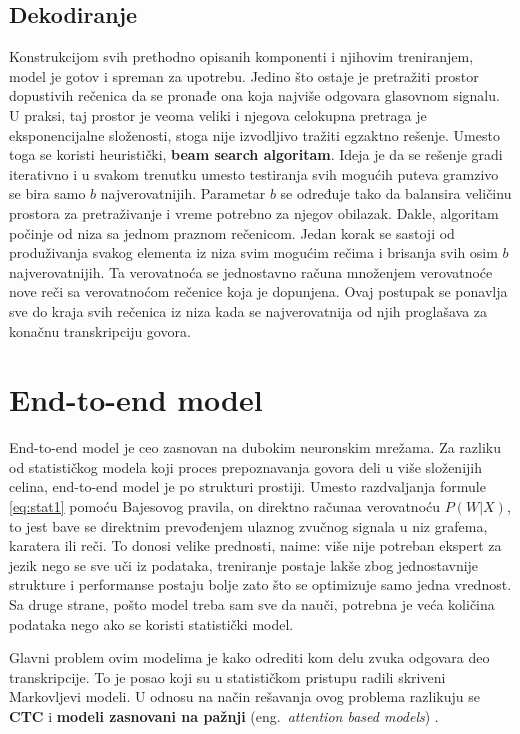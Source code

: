 \documentclass[a4paper]{article}
\begin{document}
\subsection{Dekodiranje}
\label{sec:dekodiranje}

Konstrukcijom svih prethodno opisanih komponenti i njihovim treniranjem, model je gotov i spreman za upotrebu.
Jedino što ostaje je pretražiti prostor dopustivih rečenica da se pronađe ona koja najviše odgovara glasovnom signalu.
U praksi, taj prostor je veoma veliki i njegova celokupna pretraga je eksponencijalne složenosti, stoga nije izvodljivo tražiti egzaktno rešenje.
Umesto toga se koristi heuristički, \textbf{beam search algoritam}.
Ideja je da se rešenje gradi iterativno i u svakom trenutku umesto testiranja svih mogućih puteva gramzivo se bira samo $b$ najverovatnijih.
Parametar $b$ se određuje tako da balansira veličinu prostora za pretraživanje i vreme potrebno za njegov obilazak.
Dakle, algoritam počinje od niza sa jednom praznom rečenicom.
Jedan korak se sastoji od produživanja svakog elementa iz niza svim mogućim rečima i brisanja svih osim $b$ najverovatnijih.
Ta verovatnoća se jednostavno računa množenjem verovatnoće nove reči sa verovatnoćom rečenice koja je dopunjena.
Ovaj postupak se ponavlja sve do kraja svih rečenica iz niza kada se najverovatnija od njih proglašava za konačnu transkripciju govora.

\section{End-to-end model}
\label{sec:e2e}

End-to-end model je ceo zasnovan na dubokim neuronskim mrežama.
Za razliku od statističkog modela koji proces prepoznavanja govora deli u više složenijih celina, end-to-end model je po strukturi prostiji.
Umesto razdvaljanja formule \ref{eq:stat1} pomoću Bajesovog pravila, on direktno računaa verovatnoću $P(W|X)$, to jest
bave se direktnim prevođenjem ulaznog zvučnog signala u niz grafema, karatera ili reči.
To donosi velike prednosti, naime: više nije potreban ekspert za jezik nego se sve uči iz podataka, treniranje postaje lakše zbog jednostavnije strukture i performanse postaju bolje zato što se optimizuje samo jedna vrednost.
Sa druge strane, pošto model treba sam sve da nauči, potrebna je veća količina podataka nego ako se koristi statistički model.

Glavni problem ovim modelima je kako odrediti kom delu zvuka odgovara deo transkripcije.
To je posao koji su u statističkom pristupu radili skriveni Markovljevi modeli.
U odnosu na način rešavanja ovog problema razlikuju se \textbf{CTC} \cite{graves2006ctc} i \textbf{modeli zasnovani na pažnji} (eng.~{\em attention based models}) \cite{chorowski2015attentionbased}.
\end{document}
